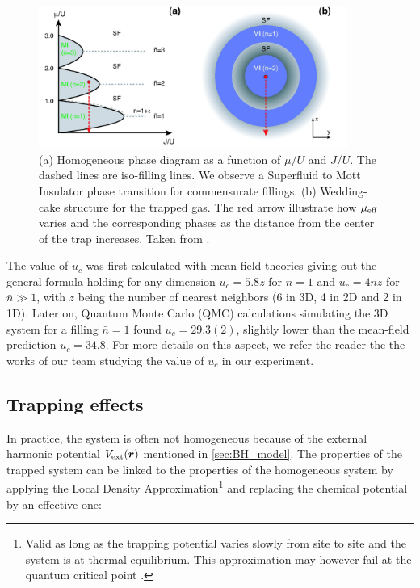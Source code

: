 \begin{figure}
    \centering
    \includegraphics[width=0.9\textwidth]{Fig/Chapter2/mott_lobes.png}
    \caption[Homogeneous phase diagram as a function of $\mu/U$ and $J/U$ and wedding-cake structure for the trapped gas]{(a) Homogeneous phase diagram as a function of $\mu/U$ and $J/U$. The dashed lines are iso-filling lines. We observe a Superfluid to Mott Insulator phase transition for commensurate fillings. (b) Wedding-cake structure for the trapped gas. The red arrow illustrate how $\mu_{\rm{eff}}$ varies and the corresponding phases as the distance from the center of the trap increases. Taken from \cite{bloch2008many}.}
    \label{fig:mott_lobes}
\end{figure}

The value of $u_c$ was first calculated with mean-field theories giving out the general formula holding for any dimension $u_c=5.8z$ for $\bar{n}=1$ and $u_c=4 \bar{n} z$ for $\bar{n} \gg 1$, with $z$ being the number of nearest neighbors (6 in 3D, 4 in 2D and 2 in 1D). Later on, Quantum Monte Carlo (QMC) calculations \cite{capogrosso2007phase} simulating the 3D system for a filling $\bar{n}=1$ found $u_c=29.3(2)$, \ie slightly lower than the mean-field prediction $u_c=34.8$. For more details on this aspect, we refer the reader the the works of our team \cite{carcy_these,herce2021studying} studying the value of $u_c$ in our experiment. 



\subsection{Trapping effects}

\label{sec:ch2_trapping_effects}

In practice, the system is often not homogeneous because of the external harmonic potential $V_{\rm{ext}}(\bm{r})$ mentioned in \ref{sec:BH_model}. The properties of the trapped system can be linked to the properties of the homogeneous system by applying the Local Density Approximation\footnote{Valid as long as the trapping potential varies slowly from site to site and the system is at thermal equilibrium. This approximation may however fail at the quantum critical point \cite{pollet2012recent}.} \cite{bergkvist2004local} and replacing the chemical potential by an effective one:

